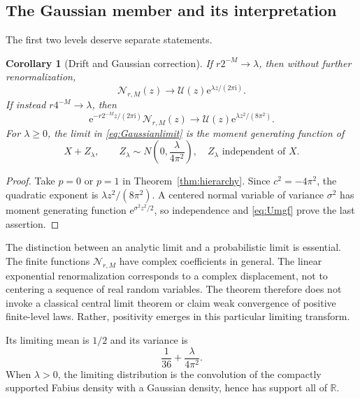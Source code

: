 \documentclass[11pt,letterpaper]{article}
\numberwithin{equation}{section}
\newtheorem{corollary}[theorem]{Corollary}
\theoremstyle{definition}
\theoremstyle{remark}
\newcommand{\R}{\mathbb R}
\newcommand{\ii}{\mathrm i}
\newcommand{\Up}{\mathcal U}
\newcommand{\Np}{\mathcal N}
\newcommand{\e}{\mathrm e}
\begin{document}
\subsection{The Gaussian member and its interpretation}
The first two levels deserve separate statements.

\begin{corollary}[Drift and Gaussian correction]
If \(r2^{-M}\to\lambda\), then without further renormalization,
\begin{equation}
 \Np_{r,M}(z)\longrightarrow\Up(z)\e^{\lambda z/(2\pi\ii)}.
 \label{eq:driftlimit}
\end{equation}
If instead \(r4^{-M}\to\lambda\), then
\begin{equation}
 \e^{-r2^{-M}z/(2\pi\ii)}\Np_{r,M}(z)
 \longrightarrow\Up(z)\e^{\lambda z^2/(8\pi^2)}.
 \label{eq:Gaussianlimit}
\end{equation}
For \(\lambda\geq0\), the limit in \eqref{eq:Gaussianlimit} is the moment generating function of
\begin{equation}
 X+Z_\lambda,\qquad
 Z_\lambda\sim N\left(0,\frac{\lambda}{4\pi^2}\right),
 \quad Z_\lambda\text{ independent of }X.
 \label{eq:Gaussianlaw}
\end{equation}
\end{corollary}
\begin{proof}
Take \(p=0\) or \(p=1\) in Theorem~\ref{thm:hierarchy}. Since \(c^2=-4\pi^2\), the quadratic exponent is \(\lambda z^2/(8\pi^2)\). A centered normal variable of variance \(\sigma^2\) has moment generating function \(\e^{\sigma^2z^2/2}\), so independence and \eqref{eq:Umgf} prove the last assertion.
\end{proof}

The distinction between an analytic limit and a probabilistic limit is essential. The finite functions \(\Np_{r,M}\) have complex coefficients in general. The linear exponential renormalization corresponds to a complex displacement, not to centering a sequence of real random variables. The theorem therefore does not invoke a classical central limit theorem or claim weak convergence of positive finite-level laws. Rather, positivity emerges in this particular limiting transform.

Its limiting mean is \(1/2\) and its variance is
\begin{equation}
 \frac1{36}+\frac{\lambda}{4\pi^2}.
\end{equation}
When \(\lambda>0\), the limiting distribution is the convolution of the compactly supported Fabius density with a Gaussian density, hence has support all of \(\R\).
\end{document}

